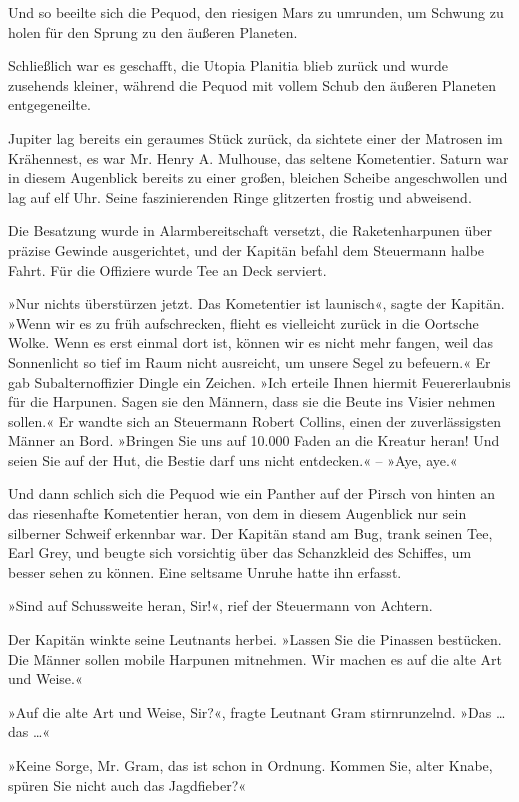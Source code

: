 Und so beeilte sich die Pequod, den riesigen Mars zu umrunden, um
Schwung zu holen für den Sprung zu den äußeren Planeten.

Schließlich war es geschafft, die Utopia Planitia blieb zurück und
wurde zusehends kleiner, während die Pequod mit vollem Schub den
äußeren Planeten entgegeneilte.

Jupiter lag bereits ein geraumes Stück zurück, da sichtete einer
der Matrosen im Krähennest, es war Mr. Henry A. Mulhouse, das
seltene Kometentier. Saturn war in diesem Augenblick bereits zu
einer großen, bleichen Scheibe angeschwollen und lag auf elf Uhr.
Seine faszinierenden Ringe glitzerten frostig und abweisend.

Die Besatzung wurde in Alarmbereitschaft versetzt, die
Raketenharpunen über präzise Gewinde ausgerichtet, und der Kapitän
befahl dem Steuermann halbe Fahrt. Für die Offiziere wurde Tee an
Deck serviert.

»Nur nichts überstürzen jetzt. Das Kometentier ist launisch«, sagte
der Kapitän. »Wenn wir es zu früh aufschrecken, flieht es
vielleicht zurück in die Oortsche Wolke. Wenn es erst einmal dort
ist, können wir es nicht mehr fangen, weil das Sonnenlicht so tief
im Raum nicht ausreicht, um unsere Segel zu befeuern.« Er gab
Subalternoffizier Dingle ein Zeichen. »Ich erteile Ihnen hiermit
Feuererlaubnis für die Harpunen. Sagen sie den Männern, dass sie
die Beute ins Visier nehmen sollen.« Er wandte sich an Steuermann
Robert Collins, einen der zuverlässigsten Männer an Bord. »Bringen
Sie uns auf 10.000 Faden an die Kreatur heran! Und seien Sie auf
der Hut, die Bestie darf uns nicht entdecken.« – »Aye, aye.«

Und dann schlich sich die Pequod wie ein Panther auf der Pirsch von
hinten an das riesenhafte Kometentier heran, von dem in diesem
Augenblick nur sein silberner Schweif erkennbar war. Der Kapitän
stand am Bug, trank seinen Tee, Earl Grey, und beugte sich
vorsichtig über das Schanzkleid des Schiffes, um besser sehen zu
können. Eine seltsame Unruhe hatte ihn erfasst.

»Sind auf Schussweite heran, Sir!«, rief der Steuermann von
Achtern.

Der Kapitän winkte seine Leutnants herbei. »Lassen Sie die Pinassen
bestücken. Die Männer sollen mobile Harpunen mitnehmen. Wir machen
es auf die alte Art und Weise.«

»Auf die alte Art und Weise, Sir?«, fragte Leutnant Gram
stirnrunzelnd. »Das \ldots{} das \ldots{}«

»Keine Sorge, Mr. Gram, das ist schon in Ordnung. Kommen Sie, alter
Knabe, spüren Sie nicht auch das Jagdfieber?«

